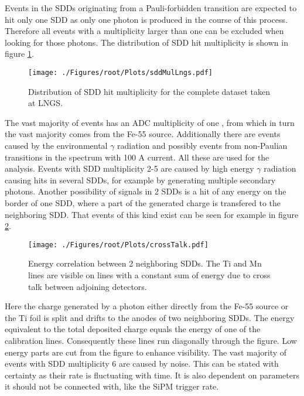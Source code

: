 Events in the SDDs originating from a Pauli-forbidden transition are expected to hit only one SDD as only one photon is produced in the course of this process. Therefore all events with a multiplicity larger than one can be excluded when looking for those photons. The distribution of SDD hit multiplicity is shown in figure \ref{fig:sddMulLngs}.
\begin{figure}[h]
 \centering
 \texttt{[image: ./Figures/root/Plots/sddMulLngs.pdf]}
 \caption{Distribution of SDD hit multiplicity for the complete dataset taken at LNGS.}
 \label{fig:sddMulLngs}
\end{figure}
The vast majority of events has an ADC multiplicity of one , from which in turn the vast majority comes from the Fe-55 source. Additionally there are events caused by the environmental $\gamma$ radiation and possibly events from non-Paulian transitions in the spectrum with 100 A current. All these are used for the analysis. Events with SDD multiplicity 2-5 are caused by high energy $\gamma$ radiation causing hits in several SDDs, for example by generating multiple secondary photons. Another possibility of signals in 2 SDDs is a hit of any energy on the border of one SDD, where a part of the generated charge is transfered to the neighboring SDD. That events of this kind exist can be seen for example in figure \ref{fig:crossTalk}.
\begin{figure}[h]
 \centering
 \texttt{[image: ./Figures/root/Plots/crossTalk.pdf]}
 \caption{Energy correlation between 2 neighboring SDDs. The Ti and Mn lines are visible on lines with a constant sum of energy due to cross talk between adjoining detectors.}
 \label{fig:crossTalk}
\end{figure}
Here the charge generated by a photon either directly from the Fe-55 source or the Ti foil is split and drifts to the anodes of two neighboring SDDs. The energy equivalent to the total deposited charge equals the energy of one of the calibration lines. Consequently these lines run diagonally through the figure. Low energy parts are cut from the figure to enhance visibility. The vast majority of events with SDD multiplicity 6 are caused by noise. This can be stated with certainty as their rate is fluctuating with time. It is also dependent on parameters it should not be connected with, like the SiPM trigger rate.

